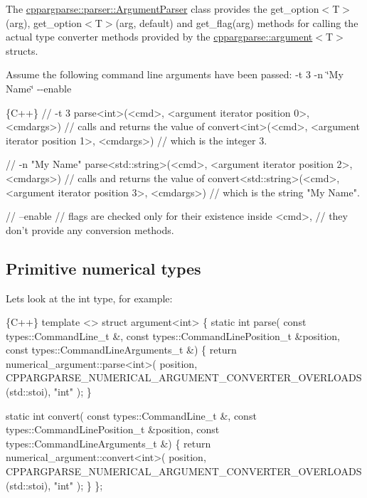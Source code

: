 The {\ttfamily \hyperlink{classcppargparse_1_1parser_1_1ArgumentParser}{cppargparse\+::parser\+::\+Argument\+Parser}} class provides the {\ttfamily get\+\_\+option$<$T$>$(arg)}, {\ttfamily get\+\_\+option$<$T$>$(arg, default)} and {\ttfamily get\+\_\+flag(arg)} methods for calling the actual type converter methods provided by the {\ttfamily \hyperlink{structcppargparse_1_1argument}{cppargparse\+::argument}$<$T$>$} structs.

Assume the following command line arguments have been passed\+: {\ttfamily -\/t 3 -\/n \char`\"{}\+My Name\char`\"{} -\/-\/enable} 
\begin{DoxyCode}
\{C++\}
// -t 3
parse<int>(<cmd>, <argument iterator position 0>, <cmdargs>)
// calls and returns the value of
convert<int>(<cmd>, <argument iterator position 1>, <cmdargs>)
// which is the integer 3.


// -n "My Name"
parse<std::string>(<cmd>, <argument iterator position 2>, <cmdargs>)
// calls and returns the value of
convert<std::string>(<cmd>, <argument iterator position 3>, <cmdargs>)
// which is the string "My Name".


// --enable
// flags are checked only for their existence inside <cmd>,
// they don't provide any conversion methods.
\end{DoxyCode}


\subsection*{Primitive numerical types}

Let\textquotesingle{}s look at the {\ttfamily int} type, for example\+: 
\begin{DoxyCode}
\{C++\}
template <>
struct argument<int>
\{
    static int parse(
            const types::CommandLine\_t &,
            const types::CommandLinePosition\_t &position,
            const types::CommandLineArguments\_t &)
    \{
        return numerical\_argument::parse<int>(
            position,
            CPPARGPARSE\_NUMERICAL\_ARGUMENT\_CONVERTER\_OVERLOADS(std::stoi),
            "int"
        );
    \}

    static int convert(
            const types::CommandLine\_t &,
            const types::CommandLinePosition\_t &position,
            const types::CommandLineArguments\_t &)
    \{
        return numerical\_argument::convert<int>(
            position,
            CPPARGPARSE\_NUMERICAL\_ARGUMENT\_CONVERTER\_OVERLOADS(std::stoi),
            "int"
        );
    \}
\};
\end{DoxyCode}


